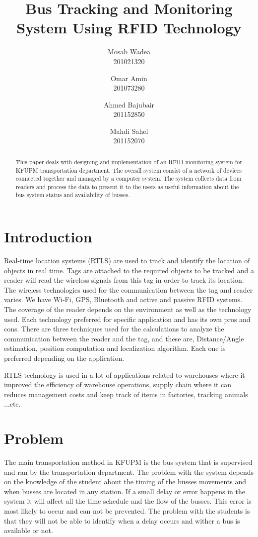 \documentclass[a4paper,twoside]{IEEEtran}
\title{Bus Tracking and Monitoring System Using RFID Technology}
\author{
        Mosab Wadea\\
        201021320
\and
        Omar Amin\\
        201073280
\and
        Ahmed Bajubair\\
        201152850
\and
        Mahdi Sahel\\
        201152070
}
\begin{document}
\maketitle


\begin{abstract}
This paper deals with designing and implementation of an RFID monitoring system for KFUPM transportation department. The overall system consist of a network of devices connected together and managed by a computer system. The system collects data from readers and process the data to present it to the users as useful information about the bus system status and availability of busses.
\end{abstract}


\section{Introduction}
Real-time location systems (RTLS) are used to track and identify the location of objects in real time\cite{3}. Tags are attached to the required objects to be tracked and a reader will read the wireless signals from this tag in order to track its location. The wireless technologies used for the communication between the tag and reader varies. We have Wi-Fi, GPS, Bluetooth and active and passive RFID systems\cite{4}. The coverage of the reader depends on the environment as well as the technology used. Each technology preferred for specific application and has its own pros and cons. There are three techniques used for the calculations to analyze the communication between the reader and the tag, and these are, Distance/Angle estimation, position computation and localization algorithm. Each one is preferred depending on the application.


RTLS technology is used in a lot of applications related to warehouses where it improved the efficiency of warehouse operations, supply chain where it can reduces management costs and keep track of items in factories, tracking animals ...etc.
\section{Problem}
The main transportation method in KFUPM is the bus system that is supervised and ran by the transportation department. The problem with the system depends on the knowledge of the student about the timing of the busses movements and when busses are located in any station. If a small delay or error happens in the system it will affect all the time schedule and the flow of the busses. This error is most likely to occur and can not be prevented. The problem with the students is that they will not be able to identify when a delay occurs and wither a bus is available or not.
\end{document}
